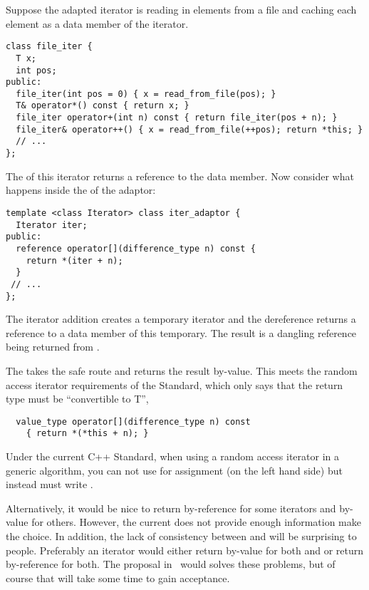 \documentclass{netobjectdays}
\begin{document}
Suppose the adapted iterator is reading in elements from a file and
caching each element as a data member of the iterator.

{\footnotesize
\begin{verbatim}
class file_iter {
  T x;
  int pos;
public:
  file_iter(int pos = 0) { x = read_from_file(pos); }
  T& operator*() const { return x; }
  file_iter operator+(int n) const { return file_iter(pos + n); }
  file_iter& operator++() { x = read_from_file(++pos); return *this; }
  // ...
};
\end{verbatim}
}

\noindent The  of this iterator returns a reference to
the data member. Now consider what happens inside the
 of the adaptor:

{\footnotesize
\begin{verbatim}
template <class Iterator> class iter_adaptor {
  Iterator iter;
public:
  reference operator[](difference_type n) const {
    return *(iter + n);
  }
 // ...
};
\end{verbatim}
}

\noindent The iterator addition creates a temporary iterator and the
dereference returns a reference to a data member of this
temporary. The result is a dangling reference being returned from
.


The  takes the safe route and returns the
result by-value. This meets the random access iterator requirements of
the Standard, which only says that the return type must be
``convertible to T'',

{\footnotesize
\begin{verbatim}
  value_type operator[](difference_type n) const
    { return *(*this + n); }
\end{verbatim}
}

Under the current {C++} Standard, when using a random access iterator
in a generic algorithm, you can not use  for
assignment (on the left hand side) but instead must write .

Alternatively, it would be nice to return by-reference for some
iterators and by-value for others. However, the current
 does not provide enough information make the
choice. In addition, the lack of consistency between 
and  will be surprising to people. Preferably an
iterator would either return by-value for both  and
 or return by-reference for both.  The proposal
in~\cite{siek01:_improved_iter_cat} would solves these problems, but
of course that will take some time to gain acceptance.
\end{document}
